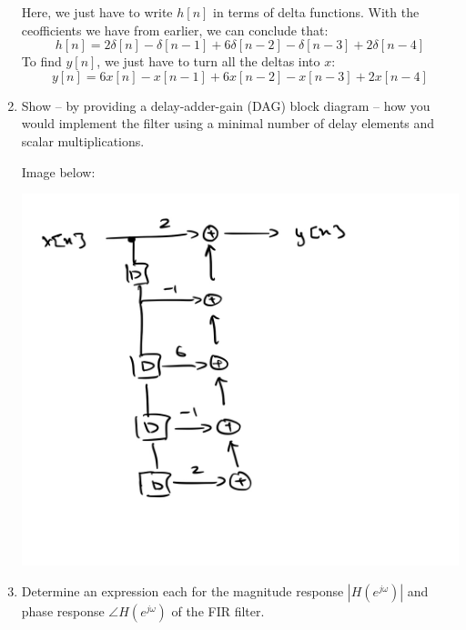 \documentclass[10pt]{article}
\begin{document}
\begin{enumerate}[label=\alph*)]
			\begin{solution}
				Here, we just have to write \( h[n] \) in terms of delta functions. With the ceofficients 
				we have from earlier, we can conclude that:
				\[
					h[n] = 2\delta[n] - \delta[n - 1] + 6\delta[n - 2] - \delta[n - 3] + 2\delta[n - 4]
				\] 
				To find \( y[n] \), we just have to turn all the deltas into \( x \):
				\[
					y[n] = 6x[n] - x[n-1] + 6x[n -2] - x[n - 3] + 2x[n - 4]
				\] 
			\end{solution}
		\item Show -- by providing a delay-adder-gain (DAG) block diagram -- how you would implement the filter 
			using a minimal number of delay elements and scalar multiplications. 

			\begin{solution}
				Image below:
				\begin{center}
					\includegraphics[scale=0.3]{q5c.jpeg}
				\end{center}
			\end{solution}
		\item Determine an expression each for the magnitude response \( |H(e^{j \omega})| \) and phase 
			response \( \angle H(e^{j \omega}) \) of the FIR filter. 


\end{enumerate}
\end{document}

